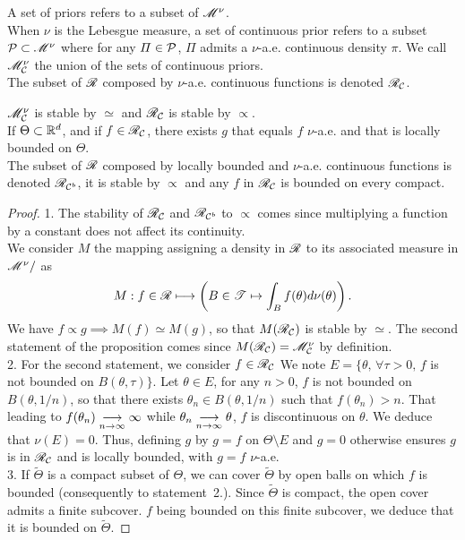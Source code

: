 \begin{defi}
    A set of priors refers to a subset of $\mathscr{M}^\nu$.\\
    When $\nu$ is the Lebesgue measure, a set of continuous prior refers to a subset $\mathcal{P}\subset\mathscr{M}^\nu$ where for any $\varPi\in\mathcal{P}$, $\varPi$ admits a $\nu$-a.e. continuous density $\pi$. We call $\mathscr{M}_{\mathcal{C}}^\nu$ the union of the sets of continuous priors.\\
    The subset of $\mathscr{R}$ composed by $\nu$-a.e. continuous functions is denoted $\mathscr{R}_{\mathcal{C}}$.
\end{defi}

\begin{prop}
    $\mathscr{M}_{\mathcal{C}}^\nu$ is stable by $\simeq$ and $\mathscr{R}_{\mathcal{C}}$ is stable by $\propto$.\\
    If $\Theta\subset\mathbb{R}^d$, and if $f\in\mathscr{R}_{\mathcal{C}}$, there exists $g$ that equals $f$ $\nu$-a.e. and that is locally bounded on $\Theta$.\\
    The subset of $\mathscr{R}$ composed by locally bounded and $\nu$-a.e. continuous functions is denoted $\mathscr{R}_{\mathcal{C}^b}$, it is stable by $\propto$ and any $f$ in $\mathscr{R}_{\mathcal{C}}$ is bounded on every compact.
\end{prop}

\begin{proof} 1.
The stability of $\mathscr{R}_{\mathcal{C}}$ and $\mathscr{R}_{\mathcal{C}^b}$ to $\propto$ comes since multiplying a function by a constant does not affect its continuity. \\
We consider $M$ the mapping assigning a density in $\mathscr{R}$ to its associated measure in $\mathscr{M}^\nu/$ as
\begin{equation}
    M:f\in\mathscr{R} \longmapsto \left(B\in\mathscr{T}\mapsto \int_Bf(\theta)d\nu(\theta) \right).
\end{equation}
We have $f\propto g\implies M(f)\simeq M(g)$, so that $M(\mathscr{R}_{\mathcal{C}}) $ is stable by $\simeq$. The second statement of the proposition comes since $M(\mathscr{R}_{\mathcal{C}})=\mathscr{M}^\nu_{\mathcal{C}}$ by definition.\\
2. For the second statement, we consider $f\in\mathscr{R}_{\mathcal{C}}$
We note $E=\{\theta,\, \forall\tau>0,\, f$ is not bounded on $B(\theta,\tau) \} $.
Let $\theta\in E$, 
for any $n>0$, $f$ is not bounded on $B(\theta,1/n)$, so that there exists $\theta_n\in B(\theta,1/n)$ such that $f(\theta_n)>n$. That leading to $f(\theta_n)\overset{\ }{\underset{n\rightarrow\infty}{\longrightarrow}}\infty$ while $\theta_n\overset{\ }{\underset{n\rightarrow\infty}{\longrightarrow}}\theta$, $f$ is discontinuous on $\theta$. 
We deduce that $\nu(E)=0$. Thus, defining $g$ by $g=f$ on $\Theta\!\setminus\! E$ and $g=0$ otherwise ensures $g$ is in $\mathscr{R}_{\mathcal{C}}$ and is locally bounded, with $g=f$ $\nu$-a.e. \\
3. If $\tilde\Theta$ is a compact subset of $\Theta$, we can cover $\tilde\Theta$ by open balls on which $f$ is bounded (consequently to statement~2.). Since $\tilde\Theta$ is compact, the open cover admits a finite  subcover. $f$ being bounded on this finite subcover, we deduce that it is bounded on $\tilde\Theta$.
\end{proof}



